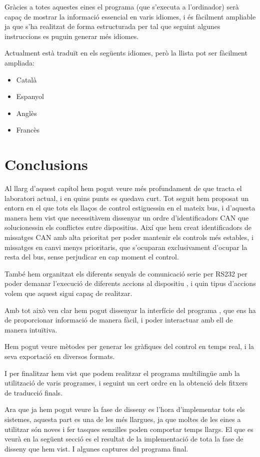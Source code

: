 Gràcies a totes aquestes eines el programa \DCSMonitor (que s'executa a l'ordinador) serà capaç de mostrar la informació essencial en varis idiomes, i és fàcilment ampliable ja que s'ha realitzat de forma estructurada per tal que seguint algunes instruccions es puguin generar més idiomes.

Actualment està traduït en els següents idiomes, però la llista pot ser fàcilment ampliada:

\begin{itemize}
	\item Català
	\item Espanyol
	\item Anglès
	\item Francès
\end{itemize}


\section{Conclusions}\label{cap:dis:conc}

Al llarg d'aquest capítol hem pogut veure més profundament de que tracta el laboratori actual, i en quins punts es quedava curt. Tot seguit hem proposat un entorn en el que tots els llaços de control estiguessin en el mateix bus, i d'aquesta manera hem vist que necessitàvem dissenyar un ordre d'identificadors CAN que solucionessin els conflictes entre dispositius. Així que hem creat identificadors de missatges CAN amb alta prioritat per poder mantenir els controls més estables, i missatges en canvi menys prioritaris, que s'ocuparan exclusivament d'ocupar la resta del bus, sense perjudicar en cap moment el control.

També hem organitzat els diferents senyals de comunicació serie per RS232 per poder demanar l'execució de diferents accions al dispositiu \Monitor, i quin tipus d'accions volem que aquest sigui capaç de realitzar.

Amb tot això ven clar hem pogut dissenyar la interfície del programa \DCSMonitor, que ens ha de proporcionar informació de manera fàcil, i poder interactuar amb ell de manera intuïtiva.

Hem pogut veure mètodes per generar les gràfiques del control en temps real, i la seva exportació en diversos formats.

I per finalitzar hem vist que podem realitzar el programa \DCSMonitor multilingüe amb la utilització de varis programes, i seguint un cert ordre en la obtenció dels fitxers de traducció finals.

Ara que ja hem pogut veure la fase de disseny es l'hora d'implementar tots els sistemes, aquesta part es una de les més llargues, ja que moltes de les eines a utilitzar són noves i fer tasques senzilles poden comportar temps llargs. El que es veurà en la següent secció es el resultat de la implementació de tota la fase de disseny que hem vist. I algunes captures del programa final.
